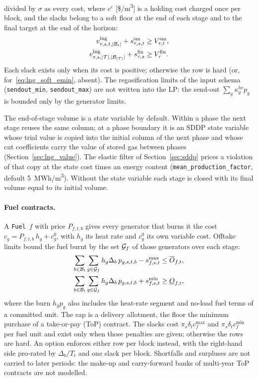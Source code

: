 divided by $\sigma$ as every cost, where $c^{e}$ [\$/m\textsuperscript{3}]
is a holding cost charged once per block, and the slacks belong to a
soft floor at the end of each stage and to the final target at the end
of the horizon:
\begin{align}
v^{\text{lng}}_{\tau,s,t,|\mathcal{B}_t|} + s^{\text{sm}}_{\tau,s,t}
  &\geq V^{\text{sm}}_{\tau,t}, \label{eq:lng_soft_emin} \\
v^{\text{lng}}_{\tau,s,|\mathcal{T}|,|\mathcal{B}_{|\mathcal{T}|}|} + s^{\text{fin}}_{\tau,s}
  &\geq V^{\text{fin}}_\tau . \label{eq:lng_efin}
\end{align}
Each slack exists only when its cost is positive; otherwise the row is
hard (or, for~\eqref{eq:lng_soft_emin}, absent).  The regasification
limits of the input schema (\texttt{sendout\_min},
\texttt{sendout\_max}) are not written into the LP: the send-out
$\sum_g \kappa_g^{hr} p_g$ is bounded only by the generator limits.

The end-of-stage volume is a state variable by default.  Within a phase
the next stage reuses the same column; at a phase boundary it is an
SDDP state variable whose trial value is copied into the initial
column of the next phase and whose cut coefficients carry the value of
stored gas between phases (Section~\ref{sec:lng_value}).  The elastic
filter of Section~\ref{sec:sddp} prices a violation of that copy at the
state cost times an energy content (\texttt{mean\_production\_factor},
default 5~MWh/m\textsuperscript{3}).  Without the state variable each
stage is closed with its final volume equal to its initial volume.

\paragraph{Fuel contracts.}
A \texttt{Fuel}~$f$ with price $P_{f,t,b}$ gives every generator that
burns it the cost $c_g = P_{f,t,b}\, h_g + c^0_g$, with $h_g$ its heat
rate and $c^0_g$ its own variable cost.  Offtake limits bound the fuel
burnt by the set $\mathcal{G}_f$ of those generators over each stage:
\begin{align}
\sum_{b \in \mathcal{B}_t} \sum_{g \in \mathcal{G}_f} h_g \Delta_b\, p_{g,s,t,b}
  - s^{\max}_{f,s,t} &\leq \overline{O}_{f,t},
  \label{eq:fuel_max} \\
\sum_{b \in \mathcal{B}_t} \sum_{g \in \mathcal{G}_f} h_g \Delta_b\, p_{g,s,t,b}
  + s^{\min}_{f,s,t} &\geq \underline{O}_{f,t},
  \label{eq:fuel_min}
\end{align}
where the burn $h_g p_g$ also includes the heat-rate segment and no-load
fuel terms of a committed unit.  The cap is a delivery allotment, the
floor the minimum purchase of a take-or-pay (ToP) contract.  The slacks
cost $\pi_s\delta_t c^{\max}_f$ and $\pi_s\delta_t c^{\min}_f$ per
fuel unit and exist only when those penalties are given; otherwise the
rows are hard.  An option enforces either row per block instead, with
the right-hand side pro-rated by $\Delta_b/T_t$ and one slack per
block.  Shortfalls and surpluses are not carried to later periods: the
make-up and carry-forward banks of multi-year ToP contracts are not
modelled.

